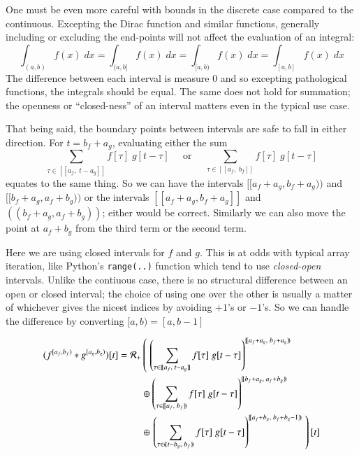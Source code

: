 One must be even more careful with bounds in the discrete case compared to the continuous.
Excepting the Dirac function and similar functions, generally including or excluding the end-points will not affect the
 evaluation of an integral:
\begin{equation*}
	\int_{(a,b)} f(x)\; dx = \int_{(a,b]}f(x)\; dx = \int_{[a,b)} f(x)\; dx = \int_{[a,b]} f(x)\;dx
\end{equation*}
The difference between each interval is measure 0 and so excepting pathological functions, the integrals should be equal.
The same does not hold for summation; the openness or ``closed-ness'' of an interval matters even in the typical use case.


That being said, the boundary points between intervals are safe to fall in either direction.
For $t=b_f+a_g$, evaluating either the sum
\begin{equation*}
	\sum_{\tau \in [\![a_f,\;t-a_g]\!]} f[\tau] \; g[t-\tau] 
	\;\;\;\;\; \text{or} \;\;\;\;\; 
	\sum_{\tau \in [\![a_f,\;b_f]\!]} f[\tau] \; g[t-\tau]
\end{equation*}
equates to the same thing.
So we can have the intervals $[\![a_f+a_g, b_f+a_g)\!)$ and $[\![b_f+a_g,a_f+b_g)\!)$ or the intervals 
$[\![a_f+a_g, b_f+a_g]\!]$ and $(\!(b_f+a_g,a_f+b_g)\!)$; either would be correct.
Similarly we can also move the point at $a_f+b_g$ from the third term or the second term.


Here we are using closed intervals for $f$ and $g$.
This is at odds with typical array iteration, like Python's \texttt{range(..)} function which tend to use \emph{closed-open} 
intervals.
Unlike the contiuous case, there is no structural difference between an open or closed interval; the choice of using one over 
the other is usually a matter of whichever gives the nicest indices by avoiding $+1$'s or $-1$'s.
So we can handle the difference by converting $[a,b) = [a,b-1]$


\begin{align}
	(f^{[a_f,b_f)} * g^{[a_g, b_g)})[t] = 
		\R[+] &\left( \; \left( 
			\sum_{\tau \in [\![a_f,\;t-a_g]\!]} f[\tau] \; g[t-\tau] \right)^{[\![a_f+a_g,\; b_f+a_g)\!)} 
				\right. \notag \\ &\oplus \left( 
			\sum_{\tau \in [\![a_f,\;b_f)\!)} f[\tau] \; g[t-\tau] \right)^{[\![b_f+a_g,\; a_f+b_g)\!)} 
				\notag \\ &\oplus \left. \left( 
			\sum_{\tau \in (\!(t-b_g,\;b_f)\!)} f[\tau] \; g[t-\tau] \right)^{[\![a_f+b_g,\; b_f+b_g-1)\!)} 
				\; \right)[t]
\end{align}





